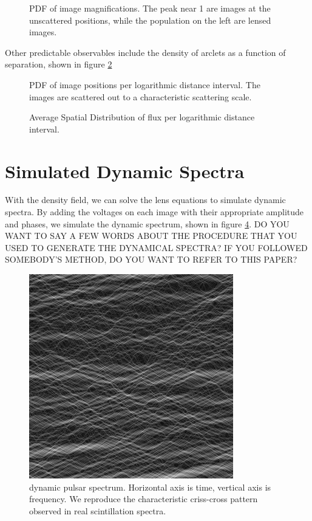 \documentclass[useAMS,usenatbib]{mn2e}
\begin{document}
\begin{figure}
\centerline{}
\caption{PDF of image magnifications.  The peak near 1 are images at
  the unscattered positions, while the population on the left are
  lensed images.
}
\label{fig:mhist}
\end{figure}

Other predictable observables include the density of arclets as a
function of separation, shown in figure \ref{fig:pos}

\begin{figure}
\centerline{}
\caption{PDF of image positions per logarithmic distance interval.  The images are scattered out to a
  characteristic scattering scale.
}
\label{fig:pos}
\end{figure}
\begin{figure}
\centerline{}
\caption{Average Spatial Distribution of flux per logarithmic distance
  interval.  
}
\label{fig:posmag}
\end{figure}

\section{Simulated Dynamic Spectra}

With the density field, we can solve the lens equations to simulate
dynamic spectra.  By adding the voltages on each image  with their
appropriate amplitude and phases, we simulate the dynamic spectrum,
shown in figure \ref{fig:ds}.
DO YOU WANT TO SAY A FEW WORDS ABOUT THE PROCEDURE THAT YOU USED
TO GENERATE THE DYNAMICAL SPECTRA? IF YOU FOLLOWED SOMEBODY'S
METHOD, DO YOU WANT TO REFER TO THIS PAPER?
\begin{figure}
\centerline{\includegraphics[width=3.5in]{rspect.jpg}}
\caption{dynamic pulsar spectrum.  Horizontal axis is time, vertical
  axis is frequency.  We reproduce the characteristic criss-cross
  pattern observed in real scintillation spectra.}
\label{fig:ds}
\end{figure}
\end{document}
